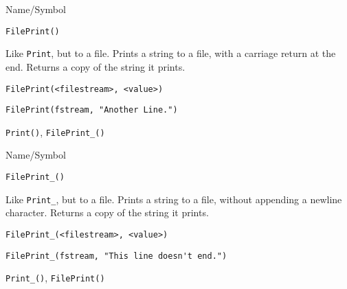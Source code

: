 \rl




\begin{desc}{Name/Symbol}
\item[Name/Symbol]	\verb+FilePrint()+

\item[Description]	Like \verb+Print+, but to a file.  Prints a string to a file, 
		with a carriage return at the end.  Returns a
  copy of the string it prints.
	
\item[Usage]
\begin{verbatim}
FilePrint(<filestream>, <value>)
\end{verbatim}

\item[Example]
\begin{verbatim}
FilePrint(fstream, "Another Line.")
\end{verbatim}

\item[See Also]	\verb+Print()+, \verb+FilePrint_()+
\end{desc}

\rl




\begin{desc}{Name/Symbol}
\item[Name/Symbol]	\verb+FilePrint_()+

\item[Description]	Like \verb+Print_+, but to a file.  Prints a
  string to a file,	without appending a newline character.  Returns a
  copy of the string it prints.
	
\item[Usage]
\begin{verbatim}
FilePrint_(<filestream>, <value>)
\end{verbatim}

\item[Example]
\begin{verbatim}
FilePrint_(fstream, "This line doesn't end.")
\end{verbatim}

\item[See Also]	\verb+Print_()+, \verb+FilePrint()+
\end{desc}

\rl



